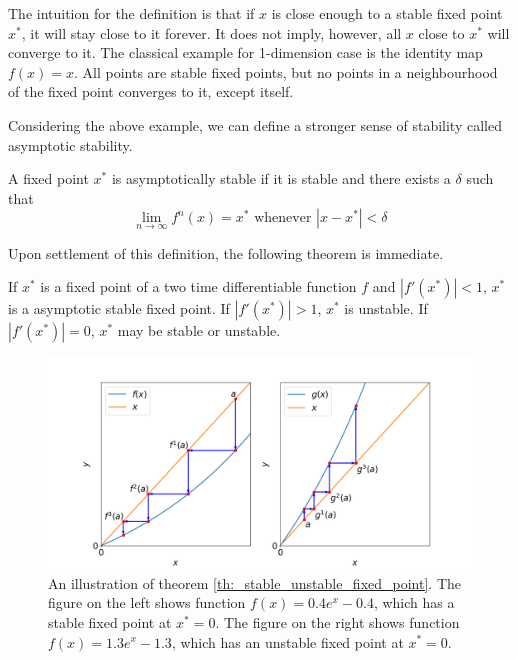 The intuition for the definition is that if $x$ is close enough to a stable fixed point $x^*$, it will stay close to it forever. 
It does not imply, however, all $x$ close to $x^*$ will converge to it.
The classical example for 1-dimension case is the identity map $f(x) = x$. 
All points are stable fixed points, but no points in a neighbourhood of the fixed point converges to it, except itself.

Considering the above example, we can define a stronger sense of stability called asymptotic stability.

\begin{defn}
	A fixed point $x^*$ is asymptotically stable if it is stable and there exists a $\delta$ such that 
	$$
		\lim_{n \rightarrow \infty} f^n(x) = x^* \text{ whenever } |x - x^*| < \delta
	$$
\end{defn}

Upon settlement of this definition, the following theorem is immediate.

\begin{thm}\label{th:_stable_unstable_fixed_point}
	If $x^*$ is a fixed point of a two time differentiable function $f$ and $|f'(x^*)| < 1$, $x^*$ is a  asymptotic stable fixed point.
	If $|f'(x^*)| > 1$, $x^*$ is unstable.
	If $|f'(x^*)| = 0$, $x^*$ may be stable or unstable.
\end{thm}

\begin{figure}
	\centering
	\includegraphics[width=\textwidth]{./figures/stable_and_unstable_fixed_point.png}
	\caption{An illustration of theorem \ref{th:_stable_unstable_fixed_point}.
	The figure on the left shows function $f(x) = 0.4 e^x - 0.4$, which has a stable fixed point at $x^* = 0$. 
	The figure on the right shows function $f(x) = 1.3 e^x - 1.3$, which has an unstable fixed point at $x^* = 0$.}
	\label{fig:stable and unstable fixed point}
\end{figure}

